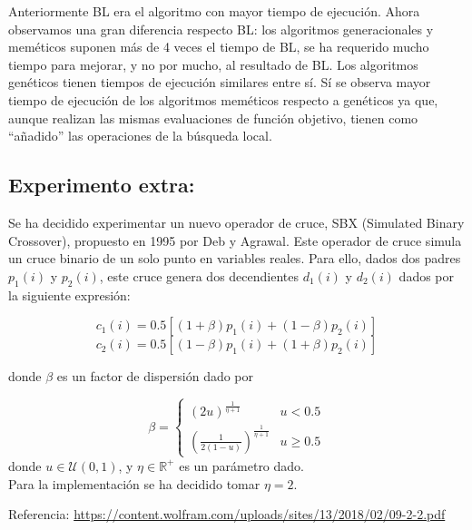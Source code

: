 \documentclass[11pt,a4paper]{article}
\theoremstyle{definition}
\begin{document}
	Anteriormente BL era el algoritmo con mayor tiempo de ejecución. Ahora observamos una gran diferencia respecto BL: los algoritmos generacionales y meméticos suponen más de 4 veces el tiempo de BL, se ha requerido mucho tiempo para mejorar, y no por mucho, al resultado de BL. Los algoritmos genéticos tienen tiempos de ejecución similares entre sí. Sí se observa mayor tiempo de ejecución de los algoritmos meméticos respecto a genéticos ya que, aunque realizan las mismas evaluaciones de función objetivo, tienen como ``añadido'' las operaciones de la búsqueda local.~\\
		
	
	\subsection{Experimento extra:}
	
	Se ha decidido experimentar un nuevo operador de cruce, SBX (Simulated Binary Crossover), propuesto en 1995 por Deb y Agrawal. Este operador de cruce simula un cruce binario de un solo punto en variables reales. Para ello, dados dos padres $p_1(i)$ y $p_2(i)$, este cruce genera dos decendientes $d_1(i)$ y $d_2(i)$ dados por la siguiente expresión:
	
	$$c_1(i)=0.5[(1+\beta ) p_1(i) + (1-\beta)p_2(i)]$$
	$$c_2(i)=0.5[(1-\beta ) p_1(i) + (1+\beta)p_2(i)]$$

	donde $\beta$ es un factor de dispersión dado por
	
	$$\beta=\begin{cases}
		(2u)^{\frac{1}{\eta+1}} & u<0.5\\
		\left(\frac{1}{2(1-u)}\right)^{\frac{1}{\eta+1}} & u\geq 0.5
	\end{cases}$$
	donde $u\in \mathcal{U}(0,1)$, y $\eta \in \mathbb{R}^+$ es un parámetro dado.\\
	
	Para la implementación se ha decidido tomar $\eta=2$.
	
	Referencia: \url{https://content.wolfram.com/uploads/sites/13/2018/02/09-2-2.pdf}~\\
	
\end{document}
